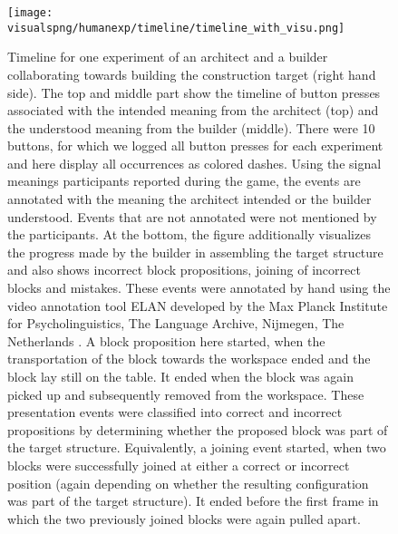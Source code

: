 \begin{figure}[!htbp]
\begin{widepage}
\centering
\texttt{[image: \\visualspng/humanexp/timeline/timeline\_with\_visu.png]}
\end{widepage}
\caption{Timeline for one experiment of an architect and a builder collaborating towards building the construction target (right hand side). 
The top and middle part show the timeline of button presses associated with the intended meaning from the architect (top) and the understood meaning from the builder (middle). There were 10 buttons, for which we logged all button presses for each experiment and here display all occurrences as colored dashes. Using the signal meanings participants reported during the game, the events are annotated with the meaning the architect intended or the builder understood. Events that are not annotated were not mentioned by the participants.
At the bottom, the figure additionally visualizes the progress made by the builder in assembling the target structure and also shows incorrect block propositions, joining of incorrect blocks and mistakes. These events were annotated by hand using the video annotation tool ELAN developed by the Max Planck Institute for Psycholinguistics, The Language Archive, Nijmegen, The Netherlands \cite{wittenburg2006elan}. A block proposition here started, when the transportation of the block towards the workspace ended and the block lay still on the table. It ended when the block was again picked up and subsequently removed from the workspace. These presentation events were classified into correct and incorrect propositions by determining whether the proposed block was part of the target structure. Equivalently, a joining event started, when two blocks were successfully joined at either a correct or incorrect position (again depending on whether the resulting configuration was part of the target structure). It ended before the first frame in which the two previously joined blocks were again pulled apart.}
\label{fig:timeline}
\end{figure}

